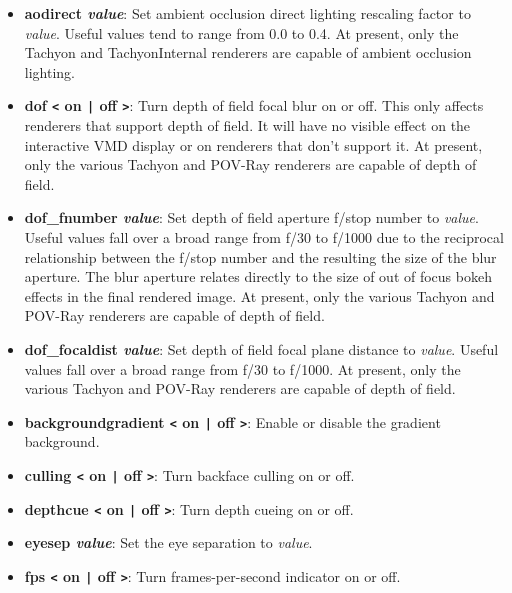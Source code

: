 \begin{itemize}
\item {\bf  aodirect {\it value}}:
    Set ambient occlusion direct lighting rescaling factor to {\it value}.
    Useful values tend to range from 0.0 to 0.4. 
    At present, only the Tachyon and TachyonInternal renderers are capable
    of ambient occlusion lighting.


\item {\bf dof {\tt <}  on {\tt |} off {\tt >}}:
    Turn depth of field focal blur on or off.  This only affects renderers
    that support depth of field.  It will have no visible effect
    on the interactive VMD display or on renderers that don't support it.
    At present, only the various Tachyon and POV-Ray renderers are capable
    of depth of field.

\item {\bf  dof\_fnumber {\it value}}:
    Set depth of field aperture f/stop number to {\it value}.
    Useful values fall over a broad range from f/30 to f/1000 due
    to the reciprocal relationship between the f/stop number and the
    resulting the size of the blur aperture.  The blur aperture 
    relates directly to the size of out of focus bokeh effects in the
    final rendered image.
    At present, only the various Tachyon and POV-Ray renderers are capable
    of depth of field.

\item {\bf dof\_focaldist {\it value}}:
    Set depth of field focal plane distance to {\it value}.
    Useful values fall over a broad range from f/30 to f/1000.
    At present, only the various Tachyon and POV-Ray renderers are capable
    of depth of field.


\item {\bf backgroundgradient {\tt <}  on {\tt |} off {\tt >}}: 
  Enable or disable the gradient background. 

\item {\bf  culling {\tt <}  on {\tt |} off {\tt >}}: Turn backface culling on or off.
\item {\bf  depthcue {\tt <}  on {\tt |} off {\tt >}}: Turn depth cueing on or off.

\item {\bf  eyesep {\it value}}: Set the eye separation to {\it value}.

\item {\bf  fps {\tt <}  on {\tt |} off {\tt >}}: Turn frames-per-second
  indicator on or off.


\end{itemize}
